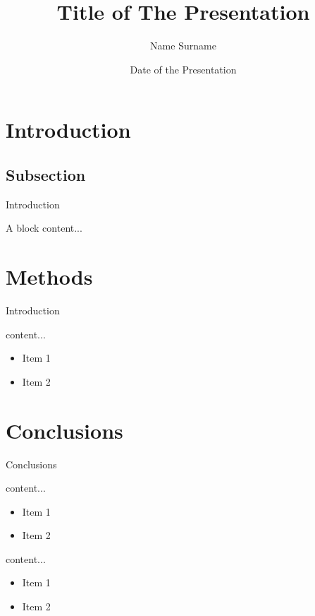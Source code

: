 \documentclass[10pt, aspectratio=169, handout]{uniudphd}
\author{Name Surname}
\title{Title of The Presentation}
\date{Date of the Presentation}
\begin{document}
	\maketitle

	\section{Introduction}
	\subsection{Subsection}
	\begin{frame}{Introduction}
		\onslide<2->\begin{block}{A block}
			content...
		\end{block}
	\end{frame}
	
	\section{Methods}
	\begin{frame}{Introduction}
		\begin{block}{content...}
			\begin{itemize}
				\item Item 1
				\item Item 2
			\end{itemize}
		\end{block}
	\end{frame}
	
	\section{Conclusions}
	\begin{frame}{Conclusions}
		\begin{block}{content...}
			\begin{itemize}
				\item Item 1
				\item Item 2
			\end{itemize}
		\end{block}
		
		\begin{block}{content...}
			\begin{itemize}
				\item Item 1
				\item Item 2
			\end{itemize}
		\end{block}
	\end{frame}
\end{document}
